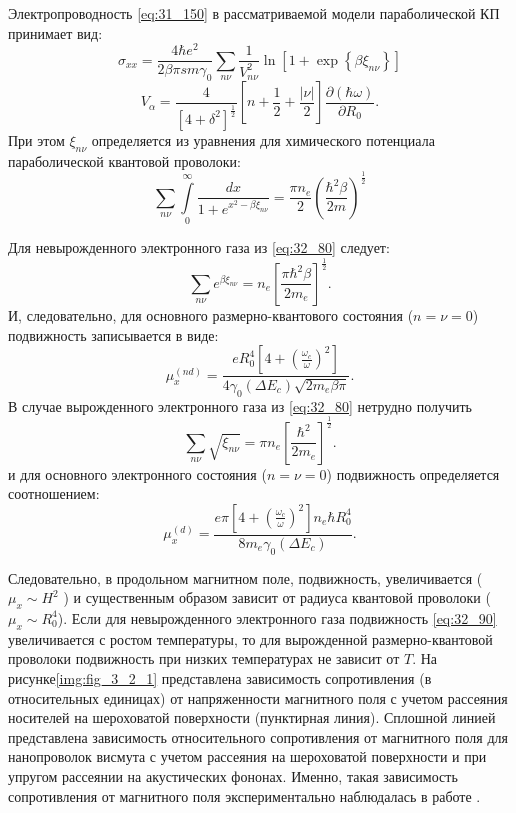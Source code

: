 Электропроводность \eqref{eq:31_150} в рассматриваемой модели параболической КП принимает вид:
\begin{equation} \label{eq:32_70}
\sigma _{xx} =\frac{4\hbar e^2 }{2\beta \pi sm\gamma_0 } \sum _{n\nu }\frac{1}{V_{n\nu }^2 } \ln \left[1+\exp \left\{\beta \xi _{n\nu } \right\}\right]
\end{equation}
\[
V_{\alpha } =\frac{4}{\left[4+\delta^2 \right]^{\frac{1}{2} } } \left[n+\frac{1}{2} +\frac{\left|\nu \right|}{2} \right]\frac{\partial (\hbar \omega )}{\partial R_0 } .
\] 
При этом $\xi _{n\nu }$ определяется из уравнения для химического потенциала параболической квантовой проволоки:
\begin{equation} \label{eq:32_80}
\sum_{n\nu} \int\limits_0^{\infty}\frac{dx}{1+e^{x^2 -\beta \xi_{n\nu } } } = \frac{\pi n_e }{2} \left(\frac{\hbar^2 \beta }{2m} \right)^{\frac{1}{2} } 
\end{equation}

Для невырожденного электронного газа из \eqref{eq:32_80} следует:
\[
\sum_{n\nu} e^{\beta \xi_{n\nu} }  =n_e \left[\frac{\pi \hbar^2 \beta}{2m_e} \right]^{\frac{1}{2}} .
\] 
И, следовательно, для основного размерно-квантового состояния ($n=\nu =0$) подвижность записывается в виде:
\begin{equation} \label{eq:32_90}
\mu_x^{\left(nd\right)} =\frac{eR_0^{4} \left[4+\left(\frac{\omega_c }{\omega } \right)^2 \right]}{4 \gamma_0 \left(\Delta E_c \right)\sqrt{2m_e\beta \pi } } . 
\end{equation}
В случае вырожденного электронного газа из \eqref{eq:32_80} нетрудно получить
\[
\sum_{n\nu }\sqrt{\xi_{n\nu } }  =\pi n_e \left[\frac{\hbar^2 }{2m_e} \right]^{\frac{1}{2} } .
\] 
и для основного электронного состояния ($n=\nu =0$) подвижность определяется соотношением:
\begin{equation} \label{eq:32_100}
\mu_x^{(d)} =\frac{e\pi \left[4+\left(\frac{\omega_c }{\omega } \right)^2 \right] n_e \hbar R_0^4 }{8m_e\gamma_0 \left(\Delta E_c \right)} .
\end{equation}
 
Следовательно, в продольном магнитном поле, подвижность, увеличивается ($\mu_x \sim H^2 $ ) и существенным образом зависит от радиуса квантовой проволоки ($\mu _{x} \sim R_0^4 $). Если для невырожденного электронного газа  подвижность \eqref{eq:32_90} увеличивается с ростом температуры, то для вырожденной размерно-квантовой проволоки подвижность при низких температурах не зависит от $T$. На рисунке\ref{img:fig_3_2_1} представлена зависимость сопротивления (в относительных единицах) от напряженности магнитного поля с учетом рассеяния носителей на шероховатой поверхности (пунктирная линия). Сплошной линией представлена зависимость относительного сопротивления от магнитного поля для нанопроволок висмута с учетом рассеяния на шероховатой поверхности и при упругом рассеянии на акустических фононах. Именно, такая зависимость сопротивления от магнитного поля экспериментально наблюдалась в работе \cite{Nikolaeva2004}.

